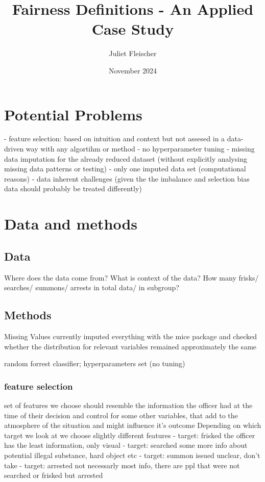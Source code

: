 \documentclass{article}
\title{Fairness Definitions - An Applied Case Study}
\author{Juliet Fleischer }
\date{November 2024}
\begin{document}
\maketitle

\section{Potential Problems}
- feature selection: based on intuition and context but not assesed in a data-driven way with any algortihm or method
- no hyperparameter tuning
- missing data imputation for the already reduced dataset (without explicitly analysing missing data patterns or testing)
- only one imputed data set (computational reasons)
- data inherent challenges (given the the imbalance and selection bias data should probably be treated differently)

\section{Data and methods}
\subsection{Data}
Where does the data come from? What is context of the data?
How many frisks/ searches/ summons/ arrests in total data/ in subgroup?
\subsection{Methods}
Missing Values
currently imputed everything with the mice package and checked whether the distribution for relevant variables remained approximately the same

random forrest classifier; hyperparameters set (no tuning)


\subsubsection{feature selection}
set of features we choose should resemble the information the officer had at the time of their decision and control for some other variables, that add to the atmosphere of the situation and might influence it's outcome
Depending on which target we look at we choose slightly different features
- target: frisked
the officer has the least information, only visual 
- target: searched
some more info about potential illegal substance, hard object etc
- target: summon issued
unclear, don't take
- target: arrested
not necessarly most info, there are ppl that were not searched or frisked but arrested
\end{document}
